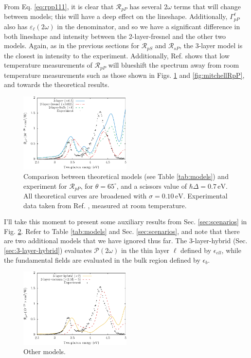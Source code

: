 From Eq. \eqref{eq:rpp111}, it is clear that $\mathcal{R}_{pP}$ has several
$2\omega$ terms that will change between models; this will have a deep effect on
the lineshape. Additionally, $\Gamma^{\ell}_{pP}$ also has
$\varepsilon_{\ell}(2\omega)$ in the denominator, and so we have a significant
difference in both lineshape and intensity between the 2-layer-fresnel and the
other two models. Again, as in the previous sections for $\mathcal{R}_{pS}$ and
$\mathcal{R}_{sP}$, the 3-layer model is the closest in intensity to the
experiment. Additionally, Ref. \cite{dadapPRB97} shows that low temperature
measurements of $\mathcal{R}_{pP}$ will blueshift the spectrum away from room
temperature measurements such as those shown in Figs. \ref{fig:RpP} and
\ref{fig:mitchellRpP}, and towards the theoretical results.

\begin{figure}[H]
\centering 
\includegraphics[width=0.5\textwidth]{content/figures/fig-Si1x1-Mejia_RpP}
\caption{Comparison between theoretical models (see Table \ref{tab:models}) and
experiment for $\mathcal{R}_{pP}$, for $\theta=65^{\circ}$, and a scissors
value of $\hbar\Delta = 0.7\,\text{eV}$. All theoretical curves are broadened
with $\sigma=0.10\,\text{eV}$. Experimental data taken from Ref.
\cite{mejiaPRB02}, measured at room temperature.}
\label{fig:RpP}
\end{figure}

I'll take this moment to present some auxiliary results from Sec.
\ref{sec:scenarios} in Fig. \ref{fig:othermodels}. Refer to Table
\ref{tab:models} and Sec. \ref{sec:scenarios}, and note that there are two
additional models that we have ignored thus far. The 3-layer-hybrid (Sec.
\ref{sec:3-layer-hybrid}) evaluates $\mathcal{P}(2\omega)$ in the thin layer
$\ell$ defined by $\epsilon_{ell}$, while the fundamental fields are evaluated
in the bulk region defined by $\epsilon_{b}$.

\begin{figure}[H]
\centering 
\includegraphics[width=0.5\textwidth]{content/figures/fig-Si1x1-Mejia_RpP_models}
\caption{Other models. \label{fig:othermodels}}
\end{figure}

